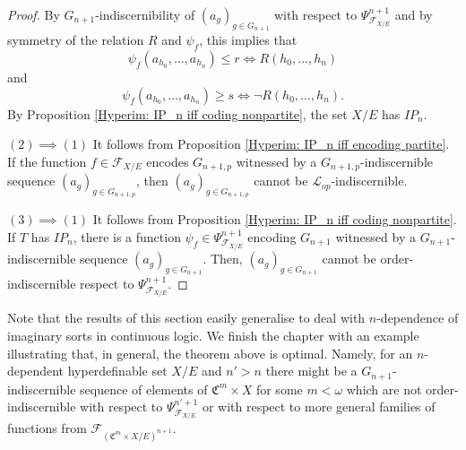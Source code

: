 \documentclass{amsart}
\newtheorem{external claim}[teor]{Claim}
\newcommand{\C}{{\mathfrak C}}
\newcommand{\mL}{\mathcal{L}}
\begin{document}
\begin{proof}
            By $G_{n+1}$-indiscernibility of $(a_g)_{g\in G_{n+1}}$ with respect to  $\Psi^{n+1}_{\mathcal{F}_{X/E}}$ and by symmetry of the relation $R$ and $\psi_f$, this implies that 
            $$ \psi_f(a_{h_0},\dots, a_{h_n})\leq r \iff R(h_{0},\dots,h_{n})$$
            and
            $$\psi_f(a_{h_0},\dots, a_{h_n})\geq s \iff \neg R(h_{0},\dots,h_{n}).$$ By Proposition \ref{Hyperim: IP_n iff coding nonpartite}, the set $X/E$ has $IP_n$.
            
              
            
            $(2)\implies(1)$ It follows from Proposition \ref{Hyperim: IP_n iff encoding partite}. If the function $f\in \mathcal{F}_{X/E}$ encodes $G_{n+1,p}$ witnessed by a $G_{n+1,p}$-indiscernible sequence $(a_g)_{g\in G_{n+1,p}}$, then $(a_g)_{g\in G_{n+1,p}}$ cannot be $\mL_{op}$-indiscernible.
            
            $(3)\implies(1)$ It follows from Proposition \ref{Hyperim: IP_n iff coding nonpartite}. If $T$ has $IP_n$, there is a function $\psi_f\in \Psi^{n+1}_{\mathcal{F}_{X/E}}$ encoding $G_{n+1}$ witnessed by a $G_{n+1}$-indiscernible sequence $(a_g)_{g\in G_{n+1}}$. Then, $(a_g)_{g\in G_{n+1}}$ cannot be order-indiscernible respect to $ \Psi^{n+1}_{\mathcal{F}_{X/E}}$.
\end{proof}
Note that the results of this section easily generalise to deal with $n$-dependence of imaginary sorts in continuous logic. We finish the chapter with an example illustrating that, in general, the theorem above is optimal. Namely, for an $n$-dependent hyperdefinable set $X/E$ and $n'>n$ there might be a $G_{n+1}$-indiscernible sequence of elements of $\C^m\times X$ for some $m<\omega$ which are not order-indiscernible with respect to $\Psi^{n'+1}_{\mathcal{F}_{X/E}}$ or with respect to more general families of functions from $\mathcal{F}_{(\C^m \times X/E)^{n+1}}$.
\end{document}
